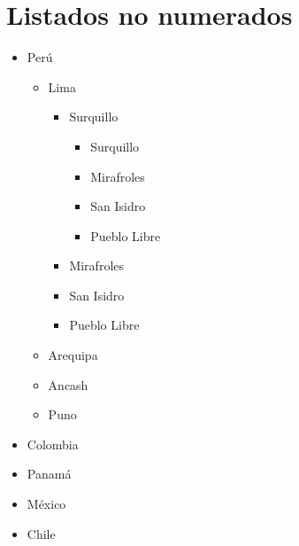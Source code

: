 \documentclass[a4paper, 11pt]{article}
\begin{document}
     \section{Listados no numerados} 
        \begin{itemize} %
            \item Perú
                \begin{itemize} %
                    \item Lima
                       \begin{itemize} %
                            \item Surquillo
                               \begin{itemize} %
                                 \item Surquillo
                                 \item Mirafroles
                                 \item San Isidro
                                 \item Pueblo Libre
                               \end{itemize}
                            \item Mirafroles
                            \item San Isidro
                            \item Pueblo Libre
                        \end{itemize}
                    \item Arequipa
                    \item Ancash
                    \item Puno
                \end{itemize}
            \item Colombia
            \item Panamá
            \item México
            \item Chile
        \end{itemize}
        
     \section{}
\end{document}
